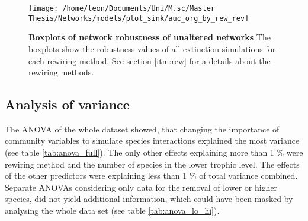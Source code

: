 \documentclass[12pt,a4paper]{article}
\begin{document}
\begin{figure}[H]
	 \centering
	 \texttt{[image: /home/leon/Documents/Uni/M.sc/Master Thesis/Networks/models/plot\_sink/auc\_org\_by\_rew\_rev]}
	 \captionsetup{width = \textwidth}
	 \caption[Boxplots of network robustness of unaltered networks]{\textbf{Boxplots of network robustness of unaltered networks} The boxplots show the robustness values of all extinction simulations for each rewiring method. See section \ref{itm:rew} for a details about the rewiring methods.}
	 \label{fig:auc_org_rew}
\end{figure}

\subsection{Analysis of variance}
The ANOVA of the whole dataset showed, that changing the importance of community variables to simulate species interactions explained the most variance (see table \ref{tab:anova_full}). The only other effects explaining more than 1 \% were rewiring method and the number of species in the lower trophic level. The effects of the other predictors were explaining less than 1 \% of total variance combined. Separate ANOVAs considering only data for the removal of lower or higher species, did not yield additional information, which could have been masked by analysing the whole data set (see table \ref{tab:anova_lo_hi}).\par

\end{document}
